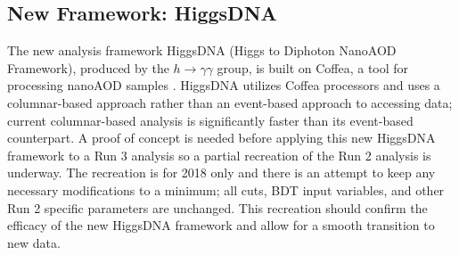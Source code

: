 \documentclass[12pt]{article}
\begin{document}

\subsection{New Framework: HiggsDNA}
The new analysis framework HiggsDNA (Higgs to Diphoton NanoAOD Framework), produced by the $h \rightarrow \gamma\gamma$ group, is built on Coffea, a tool for processing nanoAOD samples \cite{lindsey_gray_2023_8408347}. HiggsDNA utilizes Coffea processors and uses a columnar-based approach rather than an event-based approach to accessing data; current columnar-based analysis is significantly faster than its event-based counterpart.
A proof of concept is needed before applying this new HiggsDNA framework to a Run 3 analysis so a partial recreation of the Run 2 analysis is underway. The recreation is for 2018 only and there is an attempt to keep any necessary modifications to a minimum; all cuts, BDT input variables, and other Run 2 specific parameters are unchanged. This recreation should confirm the efficacy of the new HiggsDNA framework and allow for a smooth transition to new data.\par
\end{document}
